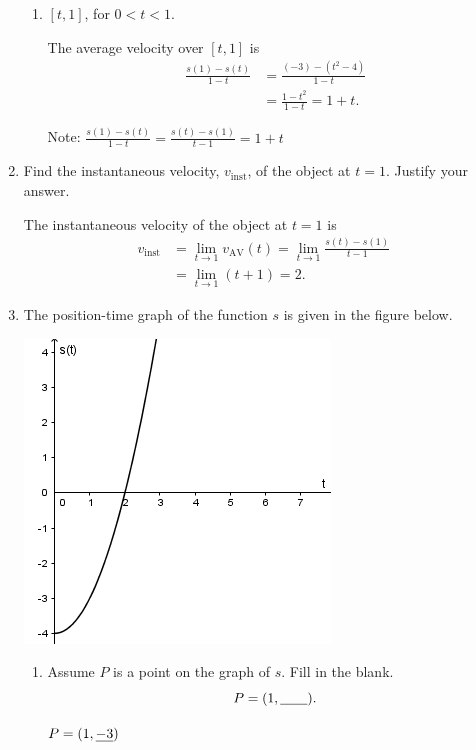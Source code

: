 \documentclass[nooutcomes]{ximera}
\begin{document}
\begin{problem}
\begin{enumerate}
\begin{enumerate}
\item
$[t, 1]$, for $0 < t < 1$.
\begin{freeResponse}
The average velocity over $[t, 1]$ is
\begin{align*}
\frac{s(1) - s(t)}{1-t} &=\frac{(-3) - (t^2-4)}{1-t}\\
&= \frac{1-t^2}{1-t} = 1+t.
\end{align*}

Note: $\frac{s(1) - s(t)}{1-t}= \frac{s(t) - s(1)}{t-1}=1+t$
\end{freeResponse}
\end{enumerate}

\item 
Find the instantaneous velocity, $v_{\mathrm{inst}}$, of the object at $t = 1$.
Justify your answer.
\begin{freeResponse}
The instantaneous velocity of the object at $t = 1$ is
\begin{align*}
v_{\mathrm{inst}} &=\lim_{t \to 1}v_{\mathrm{AV}}(t)= \lim_{t \to 1} \frac{s(t) - s(1)}{t-1} \\
&= \lim_{t \to 1} (t+1) = 2.
\end{align*}
\end{freeResponse}


\item
The position-time graph of the function $s$ is given in the figure below.
\begin{image}
\includegraphics[scale = .7]{Figure10.png}
\end{image}
\begin{enumerate}
\item
Assume $P$ is a point on the graph of $s$.
Fill in the blank.
\[
P = (1, \mbox{\underline{\hspace{2em}}}).
\]
\begin{freeResponse}
$P = (1, \mbox{\underline{$-3$}})$
\end{freeResponse}



\end{enumerate}
\end{enumerate}
\end{problem}
\end{document}
